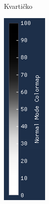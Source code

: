 \documentclass[times, utf8, diplomski]{fer}
\begin{document}
\begin{figure} [h]
\begin{subfigure}[h]{0.15\textwidth}
         \caption{Kvartičko}
         \label{fig:quartic_legend}
     \end{subfigure}
     \hfill
     \begin{subfigure}[h]{0.15\textwidth}
         \centering
         \includegraphics[width=\textwidth]{cubic_symmetrical_colormap.png}

\end{subfigure}
\end{figure}
\end{document}
